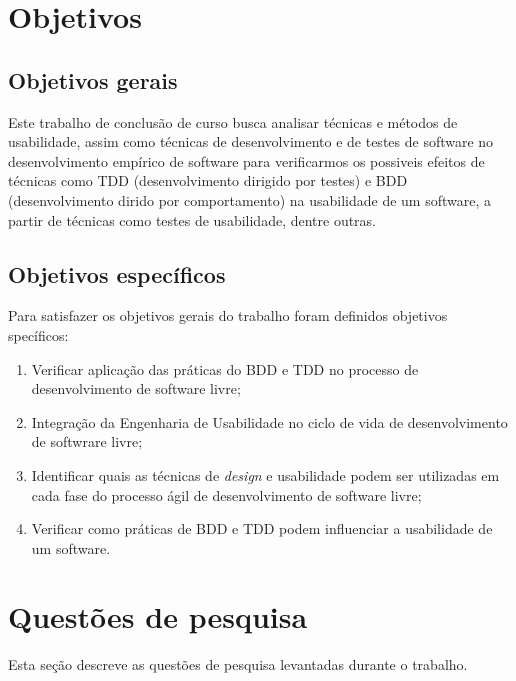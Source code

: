 \section{Objetivos}

\subsection{Objetivos gerais}
	 
Este trabalho de conclusão de curso busca analisar técnicas e métodos de usabilidade, assim como técnicas de desenvolvimento e de testes de software no desenvolvimento empírico de software para verificarmos os possiveis efeitos de técnicas como TDD (desenvolvimento dirigido por testes) e BDD (desenvolvimento dirido por comportamento) na usabilidade de um software, a partir de técnicas como testes de usabilidade, dentre outras.
	 
	 
\subsection{Objetivos específicos}

Para satisfazer os objetivos gerais do trabalho foram definidos objetivos specíficos:

\begin{enumerate}
\item Verificar aplicação das práticas do BDD e TDD no processo de desenvolvimento de software livre;
\item Integração da Engenharia de Usabilidade no ciclo de vida de desenvolvimento de softwrare livre;
\item Identificar quais as técnicas de \emph{design} e usabilidade  podem ser utilizadas em cada fase do processo ágil de desenvolvimento de software livre;
\item Verificar como práticas de BDD e TDD podem influenciar a usabilidade de um software.


\end{enumerate}

\section{Questões de pesquisa}

Esta seção descreve as questões de pesquisa levantadas durante o trabalho.

